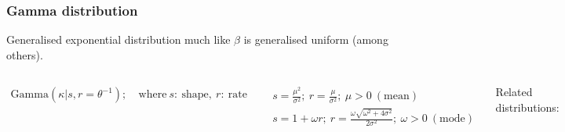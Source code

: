 \documentclass[usenames,dvipsnames,table]{beamer}
\begin{document}
\begin{frame}
\frametitle{Gamma distribution}
\footnotesize
Generalised exponential distribution much like $\beta$ is generalised uniform (among others).
\begin{columns}[c]
\begin{align*}
\mathrm{Gamma}(\kappa|s, r=\theta^{-1});& \mathrm{\ where\ } s \mathrm{:\ shape,\ }r\mathrm{:\ rate}
\end{align*}

{\tiny%
\begin{align*}
s=\frac{\mu^2}{\sigma^2};\ r=\frac{\mu}{\sigma^2};\ \mu>0 \tag{9.7} \mathrm{\ (mean)} \\
s=1+\omega r;\ r=\frac{\omega\sqrt{\omega^2+4\sigma^2}}{2\sigma^2};\ \omega>0 \mathrm{\ (mode)} \tag{9.8}
\end{align*}}

Related distributions:
\begin{itemize}
\item Exponential distribution $\exp(\lambda)=\mathrm{Gamma}(1, \lambda^{-1})$, models e.g. random decay of particles or electronical components. 
\item Chi-square $\chi^2(k)=\mathrm{Gamma}(k/2, 2)$, models sum of $k$ independent standard normal random variables.
\item ... and many more ...
\end{itemize}

\begin{figure}
\centering
\includegraphics[width=\linewidth]{img/fig9_8}
\end{figure}
\end{columns}
\end{frame}
\end{document}
